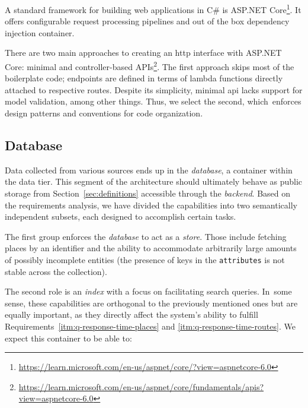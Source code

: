 A standard framework for building web applications in C\# is ASP.NET Core\footnote{\href{https://learn.microsoft.com/en-us/aspnet/core/?view=aspnetcore-6.0}{https://learn.microsoft.com/en-us/aspnet/core/?view=aspnetcore-6.0}}. It offers configurable request processing pipelines and out of the box dependency injection container.

There are two main approaches to creating an \acs{http} interface with ASP.NET Core: minimal and controller-based APIs\footnote{\href{https://learn.microsoft.com/en-us/aspnet/core/fundamentals/apis?view=aspnetcore-6.0}{https://learn.microsoft.com/en-us/aspnet/core/fundamentals/apis?view=aspnetcore-6.0}}. The first approach skips most of the boilerplate code; endpoints are defined in terms of lambda functions directly attached to respective routes. Despite its simplicity, minimal \acs{api} lacks support for model validation, among other things. Thus, we select the second, which~enforces design patterns and conventions for code organization.

\subsection{Database}\label{ssec:design-database}


Data collected from various sources ends up in the \emph{database}, a container within the data tier. This segment of the architecture should ultimately behave as public storage from Section~\ref{sec:definitions} accessible through the \emph{backend}. Based on the re\-quire\-ments analysis, we have divided the capabilities into two semantically independent subsets, each designed to accomplish certain tasks.

The first group enforces the \emph{database} to act as a \emph{store}. Those include fetching places by an identifier and the ability to accommodate arbitrarily large amounts of possibly incomplete entities (the presence of keys in the \texttt{attributes} is not stable across the collection).

The second role is an \emph{index} with a focus on facilitating search queries. In~some sense, these capabilities are orthogonal to the previously mentioned ones but are equally important, as they directly affect the system's ability to fulfill Requirements~\ref{itm:q-response-time-places} and \ref{itm:q-response-time-routes}. We expect this container to be able to:

